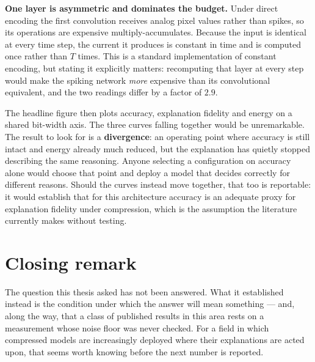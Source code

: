 \textbf{One layer is asymmetric and dominates the budget.} Under direct encoding
the first convolution receives analog pixel values rather than spikes, so its
operations are expensive multiply-accumulates. Because the input is identical at
every time step, the current it produces is constant in time and is computed once
rather than $T$ times. This is a standard implementation of constant encoding,
but stating it explicitly matters: recomputing that layer at every step would
make the spiking network \emph{more} expensive than its convolutional
equivalent, and the two readings differ by a factor of $2.9$.

The headline figure then plots accuracy, explanation fidelity and energy on a
shared bit-width axis. The three curves falling together would be unremarkable.
The result to look for is a \textbf{divergence}: an operating point where
accuracy is still intact and energy already much reduced, but the explanation has
quietly stopped describing the same reasoning. Anyone selecting a configuration
on accuracy alone would choose that point and deploy a model that decides
correctly for different reasons. Should the curves instead move together, that
too is reportable: it would establish that for this architecture accuracy is an
adequate proxy for explanation fidelity under compression, which is the
assumption the literature currently makes without testing.

\section{Closing remark}

The question this thesis asked has not been answered. What it established instead
is the condition under which the answer will mean something --- and, along the
way, that a class of published results in this area rests on a measurement whose
noise floor was never checked. For a field in which compressed models are
increasingly deployed where their explanations are acted upon, that seems worth
knowing before the next number is reported.
